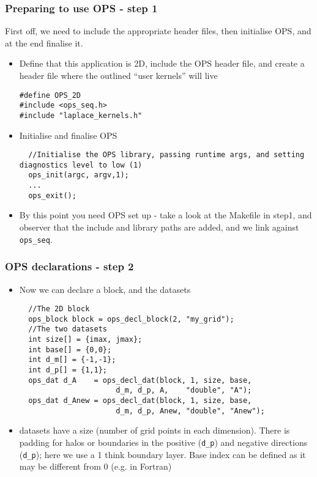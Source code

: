\documentclass{beamer}
\begin{document}
\begin{frame}[fragile]
\frametitle{Preparing to use OPS - step 1}
First off, we need to include the appropriate header files, then initialise OPS, and at the end finalise it.
\begin{itemize}
\item Define that this application is 2D, include the OPS header file, and create a header file where the outlined ``user kernels'' will live
\begin{lstlisting}
#define OPS_2D
#include <ops_seq.h>
#include "laplace_kernels.h"
\end{lstlisting}
\item Initialise and finalise OPS
\begin{lstlisting}
  //Initialise the OPS library, passing runtime args, and setting diagnostics level to low (1)
  ops_init(argc, argv,1);
  ...
  ops_exit();
\end{lstlisting}
\item By this point you need OPS set up - take a look at the Makefile in step1, and observer that the include and library paths are added, and we link against \texttt{ops\_seq}.
\end{itemize}
\end{frame}


\begin{frame}[fragile]
\frametitle{OPS declarations - step 2}
\begin{itemize}
\item Now we can declare a block, and the datasets
\begin{lstlisting}
  //The 2D block
  ops_block block = ops_decl_block(2, "my_grid");
  //The two datasets
  int size[] = {imax, jmax};
  int base[] = {0,0};
  int d_m[] = {-1,-1};
  int d_p[] = {1,1};
  ops_dat d_A    = ops_decl_dat(block, 1, size, base,
                      d_m, d_p, A,    "double", "A");
  ops_dat d_Anew = ops_decl_dat(block, 1, size, base,
                      d_m, d_p, Anew, "double", "Anew");
  \end{lstlisting}
  \item datasets have a size (number of grid points in each dimension). There is padding for halos or boundaries in the positive (\texttt{d\_p}) and negative directions (\texttt{d\_p}); here we use a 1 think boundary layer. Base index can be defined as it may be different from 0 (e.g. in Fortran)
\end{itemize}
\end{frame}
\end{document}
